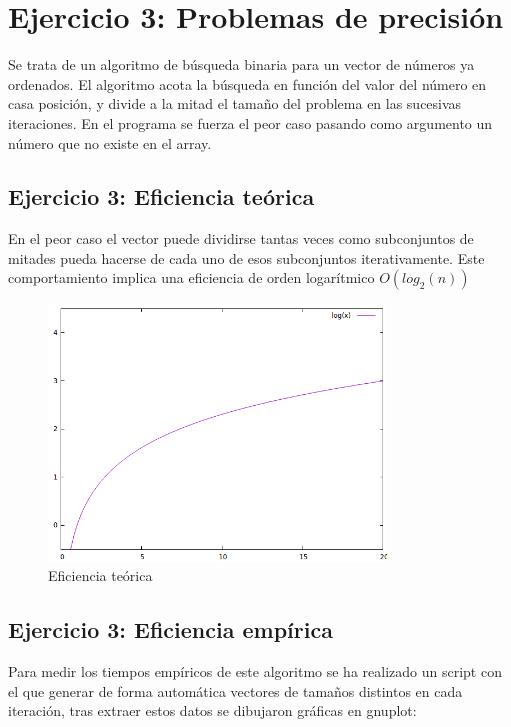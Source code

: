 \documentclass[paper=a4, fontsize=10pt]{scrartcl} %
\begin{document}
\section{Ejercicio 3:  Problemas de precisión}

Se trata de un algoritmo de búsqueda binaria para un vector de números ya ordenados. El algoritmo acota la búsqueda en función del valor del número en casa posición, y divide a la mitad el tamaño del problema en las sucesivas iteraciones. En el programa se fuerza el peor caso pasando como argumento un número que no existe en el array.

\subsection{Ejercicio 3:  Eficiencia teórica}

En el peor caso el vector puede dividirse tantas veces como subconjuntos de mitades pueda hacerse de cada uno de esos subconjuntos iterativamente. Este comportamiento implica una eficiencia de orden logarítmico  $O(log_2(n))$ %

\begin{figure}[H] %
	\centering
	\label{lsblk}
	\includegraphics[width=0.8\textwidth]{../imgs/ej3logteoric.PNG}
	\caption{Eficiencia teórica} 
\end{figure}

\subsection{Ejercicio 3:  Eficiencia empírica}

Para medir los tiempos empíricos de este algoritmo se ha realizado un script con el que generar de forma automática vectores de tamaños distintos en cada iteración, tras extraer estos datos se dibujaron gráficas en gnuplot:
\end{document}
